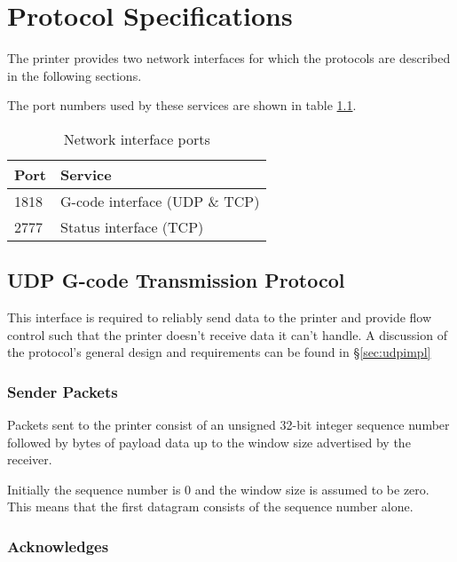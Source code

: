 \chapter{Protocol Specifications}
	
	The printer provides two network interfaces for which the protocols are
	described in the following sections.
	
	The port numbers used by these services are shown in table \ref{tab:ports}.
	
	\begin{table}
		\centering
		\begin{tabular}{l l}
			\toprule
			Port & Service \\
			\midrule
			1818 & G-code interface (UDP \& TCP) \\
			2777 & Status interface (TCP) \\
			\bottomrule
		\end{tabular}
		
		\caption{Network interface ports}
		\label{tab:ports}
	\end{table}
	
	\section{UDP G-code Transmission Protocol}
		
		\label{sec:udpSpec}
		
		This interface is required to reliably send data to the printer and provide
		flow control such that the printer doesn't receive data it can't handle. A
		discussion of the protocol's general design and requirements can be found in
		\S\ref{sec:udpimpl}
		
		\subsection{Sender Packets}
			
			Packets sent to the printer consist of an unsigned 32-bit integer sequence
			number followed by bytes of payload data up to the window size advertised
			by the receiver.
			
			Initially the sequence number is 0 and the window size is assumed to be
			zero. This means that the first datagram consists of the sequence number
			alone.
			
		\subsection{Acknowledges}
			
